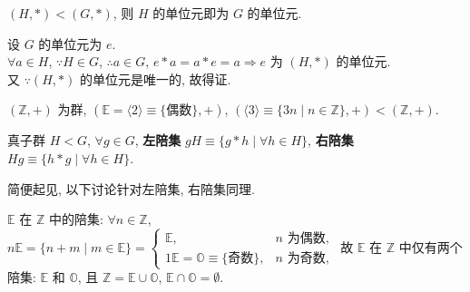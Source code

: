 \documentclass{note}
\begin{document}
\begin{thm}
    $(H,*)<(G,*)$, 则 $H$ 的单位元即为 $G$ 的单位元.
\end{thm}
\begin{pf}
    设 $G$ 的单位元为 $e$.\\
    $\forall a\in H$, $\because H\in G$, $\therefore a\in G$, $e*a=a*e=a\Longrightarrow e$ 为 $(H,*)$ 的单位元.\\
    又 $\because(H,*)$ 的单位元是唯一的, 故得证.
\end{pf}

\begin{eg}
    $(\mathbb{Z},+)$ 为群, $(\mathbb{E}=\langle 2\rangle\equiv\{\textbf{偶数}\},+)$, $(\langle 3\rangle\equiv\{3n\mid n\in\mathbb{Z}\},+)<(\mathbb{Z},+)$.
\end{eg}

\begin{df}[陪集 (Coset)]
    真子群 $H<G$, $\forall g\in G$, \textbf{左陪集} $gH\equiv\{g*h\mid\forall h\in H\}$, \textbf{右陪集} $Hg\equiv\{h*g\mid\forall h\in H\}$.
\end{df}

简便起见, 以下讨论针对左陪集, 右陪集同理.

\begin{eg}
    $\mathbb{E}$ 在 $\mathbb{Z}$ 中的陪集: $\forall n\in\mathbb{Z}$, $n\mathbb{E}=\{n+m\mid m\in\mathbb{E}\}=\left\{\begin{array}{ll}
        \mathbb{E},&n\text{ 为偶数},\\
        1\mathbb{E}=\mathbb{O}\equiv\{\text{奇数}\},&n\text{ 为奇数},
    \end{array}\right.$ 故 $\mathbb{E}$ 在 $\mathbb{Z}$ 中仅有两个陪集: $\mathbb{E}$ 和 $\mathbb{O}$, 且 $\mathbb{Z}=\mathbb{E}\cup\mathbb{O}$, $\mathbb{E}\cap\mathbb{O}=\emptyset$.
\end{eg}
\end{document}
